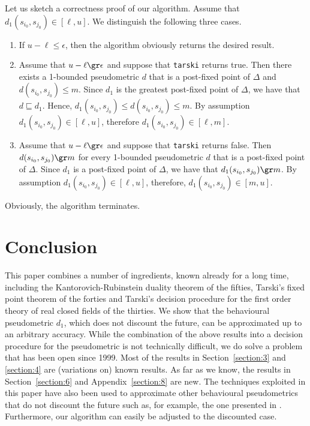 \documentclass{LMCS}
\begin{document}
Let us sketch a correctness proof of our algorithm.  Assume that
$d_1(s_{i_0}, s_{j_0}) \in [\ell, u]$.  We distinguish the following
three cases.
\begin{enumerate}[$\bullet$]
\item
If $u - \ell \le \epsilon$, then the algorithm obviously returns the
desired result.
\item
Assume that $u - \ell \gr \epsilon$ and suppose that
{\tt tarski}
returns true.  Then there exists a 1-bounded pseudometric $d$ that is 
a post-fixed point of $\Delta$ and $d(s_{i_0}, s_{j_0}) \le m$.  Since $d_1$
is the greatest post-fixed point of $\Delta$, we have that $d \sqsubseteq d_1$.
Hence, $d_1(s_{i_0}, s_{j_0}) \leq d(s_{i_0}, s_{j_0}) \le m$.  By assumption
$d_1(s_{i_0}, s_{j_0}) \in [\ell, u]$, therefore $d_1(s_{i_0}, s_{j_0}) \in [\ell, m]$.
\item
Assume that $u - \ell \gr \epsilon$ and suppose that {\tt tarski}
returns false.  Then $d(s_{i_0}, s_{j_0}) \gr m$ for every 1-bounded
pseudometric $d$ that is a post-fixed point of $\Delta$.  Since $d_1$
is a post-fixed point of $\Delta$, we have that $d_1(s_{i_0}, s_{j_0})
\gr m$.  By assumption $d_1(s_{i_0}, s_{j_0}) \in [\ell, u]$,
therefore, $d_1(s_{i_0}, s_{j_0}) \in [m, u]$.
\end{enumerate}
Obviously, the algorithm terminates.

\section{Conclusion}

This paper combines a number of ingredients, known already for a long time, 
including the Kantorovich-Rubinstein duality theorem of the fifties, 
Tarski's fixed point theorem of the forties and Tarski's decision procedure 
for the first order theory of real closed fields of the thirties.
We show that the behavioural pseudometric $d_1$, which does not discount 
the future, can be approximated up to an arbitrary accuracy.  While the 
combination of the above results into a decision procedure for the 
pseudometric is not technically difficult, we do solve a problem that has 
been open since 1999.  Most of the results in Section~\ref{section:3} and 
\ref{section:4} are (variations on) known results.  As far as we know, 
the results in Section~\ref{section:6} and Appendix~\ref{section:8} are new.
The techniques exploited in this paper have also been used to
approximate other behavioural pseudometrics that do not discount the
future such as, for example, the one presented in \cite{B05:concur}.
Furthermore, our algorithm can easily be adjusted to the discounted
case.  
\end{document}
